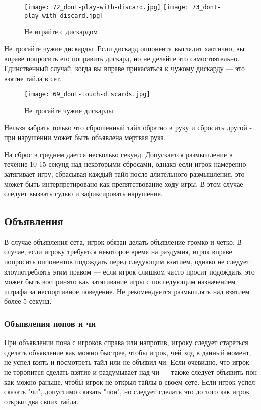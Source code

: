 \begin{figure}[H]
	\centering
	\texttt{[image: 72\_dont-play-with-discard.jpg]}
	\texttt{[image: 73\_dont-play-with-discard.jpg]}
	\caption{Не играйте с дискардом}
\end{figure}

Не трогайте чужие дискарды. Если дискард оппонента выглядит хаотично, вы вправе попросить его поправить дискард, но не делайте это самостоятельно. Единственный случай, когда вы вправе прикасаться к чужому дискарду --- это взятие тайла в сет.

\begin{figure}[H]
	\centering
	\texttt{[image: 69\_dont-touch-discards.jpg]}
	\caption{Не трогайте чужие дискарды}
\end{figure}

Нельзя забрать только что сброшенный тайл обратно в руку и сбросить другой - при нарушении может быть объявлена мертвая рука.

На сброс в среднем дается несколько секунд. Допускается размышление в течение 10-15 секунд над некоторыми сбросами, однако если игрок намеренно затягивает игру, сбрасывая каждый тайл после длительного размышления, это может быть интерпретировано как препятствование ходу игры. В этом случае следует вызвать судью и зафиксировать нарушение.

\subsection{Объявления}

В случае объявления сета, игрок обязан делать объявление громко и четко. В случае, если игроку требуется некоторое время на раздумия, игрок вправе попросить оппонентов подождать перед следующим взятием, однако не следует злоупотреблять этим правом --- если игрок слишком часто просит подождать, это может быть воспринято как затягивание игры с последующим назначением штрафа за неспортивное поведение. Не рекомендуется размышлять над взятием более 5 секунд.

\subsubsection{Объявления понов и чи}

При объявлении пона с игроков справа или напротив, игроку следует стараться сделать объявление как можно быстрее, чтобы игрок, чей ход в данный момент, не успел взять и посмотреть тайл или не объявил чи. Если очевидно, что игрок не торопится сделать взятие и раздумывает над чи --- также следует объявить пон как можно раньше, чтобы игрок не открыл тайлы в своем сете. Если игрок успел сказать "чи", допустимо сказать "пон", но следует сделать это до того как игрок открыл два своих тайла. 

